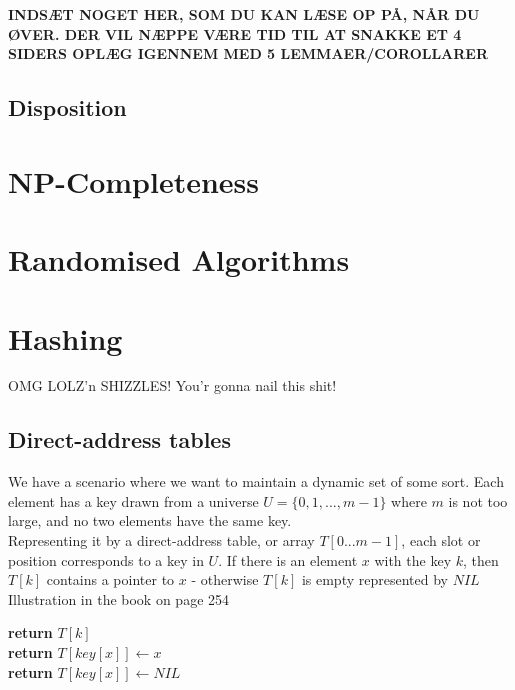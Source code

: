\documentclass[12pt]{article}
\begin{document}
\textbf{INDSÆT NOGET HER, SOM DU KAN LÆSE OP PÅ, NÅR DU ØVER. DER VIL NÆPPE VÆRE TID TIL AT SNAKKE ET 4 SIDERS OPLÆG IGENNEM MED 5 LEMMAER/COROLLARER}
%
\subsection{Disposition}
\newpage

\section{NP-Completeness}
\newpage

\section{Randomised Algorithms}
\newpage

\section{Hashing}
OMG LOLZ'n SHIZZLES! You'r gonna nail this shit!

\subsection{Direct-address tables}
We have a scenario where we want to maintain a dynamic set of some sort. Each element has a key drawn from a universe $U = \{0, 1, ..., m-1\}$ where $m$ is not too large, and no two elements have the same key. \\

Representing it by a direct-address table, or array $T[0...m-1]$, each slot or position corresponds to a key  in $U$. If there is an element $x$ with the key $k$, then $T[k]$ contains a pointer to $x$ - otherwise $T[k]$ is empty represented by $NIL$\\

Illustration in the book on page 254
\begin{algorithm}
\begin{algorithmic}[1]
   \State \textbf{return} $T[k]$\\
   
   \State \textbf{return} $T[key[x]] \leftarrow x$\\

   \State \textbf{return} $T[key[x]] \leftarrow NIL$
\end{algorithmic}
\end{algorithm}
\end{document}
